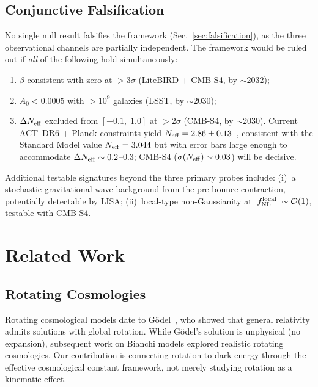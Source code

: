 \documentclass[aps,prd,twocolumn,superscriptaddress,showpacs,preprintnumbers,nofootinbib,longbibliography,floatfix]{revtex4-2}
\newcommand{\Neff}{N_{\rm eff}}
\begin{document}
\subsection{Conjunctive Falsification}\label{sec:conjunctive}
No single null result falsifies the framework (Sec.~\ref{sec:falsification}), as the three observational
channels are partially independent. The framework would be ruled out if \textit{all} of the following
hold simultaneously:
\begin{enumerate}[leftmargin=*]
\item $\beta$ consistent with zero at $>3\sigma$ (LiteBIRD + CMB-S4, by $\sim$2032);
\item $A_0 < 0.0005$ with $>10^9$ galaxies (LSST, by $\sim$2030);
\item $\Delta\Neff$ excluded from $[-0.1,\;1.0]$ at $>2\sigma$ (CMB-S4, by $\sim$2030). Current ACT~DR6 + Planck constraints yield $\Neff = 2.86 \pm 0.13$~\cite{ACTDR6Neff2025}, consistent with the Standard Model value $\Neff = 3.044$ but with error bars large enough to accommodate $\Delta\Neff \sim 0.2$--$0.3$; CMB-S4 ($\sigma(\Neff) \sim 0.03$) will be decisive.
\end{enumerate}
Additional testable signatures beyond the three primary probes include:
(i)~a stochastic gravitational wave background from the pre-bounce contraction,
potentially detectable by LISA; (ii)~local-type non-Gaussianity at $|f_{\rm NL}^{\rm local}|
\sim\mathcal{O}(1)$, testable with CMB-S4.


\section{Related Work}\label{sec:related}

\subsection{Rotating Cosmologies}

Rotating cosmological models date to G\"odel~\cite{Godel1949}, who showed that general relativity admits solutions with global rotation. While G\"odel's solution is unphysical (no expansion), subsequent work on Bianchi models explored realistic rotating cosmologies. Our contribution is connecting rotation to dark energy through the effective cosmological constant framework, not merely studying rotation as a kinematic effect.
\end{document}
